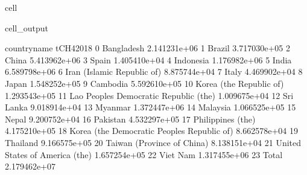 \documentclass[letterpaper,10pt,english]{jupyterBook}
\begin{document}
\begin{sphinxuseclass}{cell}
\begin{sphinxVerbatimOutput}
\begin{sphinxuseclass}{cell_output}
\begin{sphinxVerbatim}[commandchars=\\\{\}]
                                   country\PYGZus{}name     tCH4\PYGZus{}2018  
0                                    Bangladesh  2.141231e+06  
1                                        Brazil  3.717030e+05  
2                                         China  5.413962e+06  
3                                         Spain  1.405410e+04  
4                                     Indonesia  1.176982e+06  
5                                         India  6.589798e+06  
6                    Iran (Islamic Republic of)  8.875744e+04  
7                                         Italy  4.469902e+04  
8                                         Japan  1.548252e+05  
9                                      Cambodia  5.592610e+05  
10                      Korea (the Republic of)  1.293543e+05  
11       Lao People\PYGZsq{}s Democratic Republic (the)  1.009675e+04  
12                                    Sri Lanka  9.018914e+04  
13                                      Myanmar  1.372447e+06  
14                                     Malaysia  1.066525e+05  
15                                        Nepal  9.200752e+04  
16                                     Pakistan  4.532297e+05  
17                            Philippines (the)  4.175210e+05  
18  Korea (the Democratic People\PYGZsq{}s Republic of)  8.662578e+04  
19                                     Thailand  9.166575e+05  
20                   Taiwan (Province of China)  8.138151e+04  
21               United States of America (the)  1.657254e+05  
22                                     Viet Nam  1.317455e+06  
23                                        Total  2.179462e+07  
\end{sphinxVerbatim}

\end{sphinxuseclass}\end{sphinxVerbatimOutput}

\end{sphinxuseclass}
\end{document}
